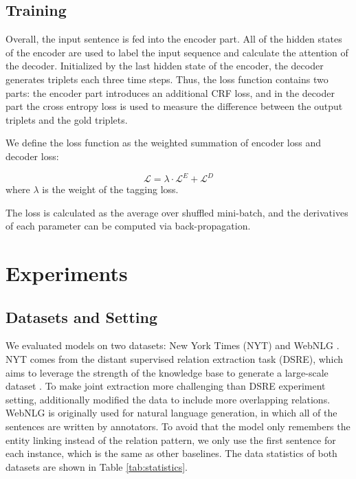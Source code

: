\documentclass[letterpaper]{article} \usepackage{aaai20}  \usepackage{times}  \usepackage{helvet} \usepackage{courier}  \usepackage[hyphens]{url}  \usepackage{graphicx}
\begin{document}
  \subsection{Training}
  
      Overall, the input sentence is fed into the encoder part. 
      All of the hidden states of the encoder are used to label the input sequence and calculate the attention of the decoder. 
      Initialized by the last hidden state of the encoder, the decoder generates triplets each three time steps. 
      Thus, the loss function contains two parts: the encoder part introduces an additional CRF loss, and in the decoder part the cross entropy loss is used to measure the difference between the output triplets and the gold triplets. 
  
      We define the loss function as the weighted summation of encoder loss and decoder loss:
  
  \begin{equation}
      \mathcal{L}= \lambda \cdot \mathcal{L}^E +\mathcal{L}^D
  \end{equation}
  where $\lambda$ is the weight of the tagging loss.
  
  The loss is calculated as the average over shuffled mini-batch, and the derivatives of each parameter can be computed via back-propagation. 



    
  
  \section{Experiments}
  










  \subsection{Datasets and Setting}
  


      We evaluated models on two datasets: New York Times (NYT) \cite{nyt} 
and WebNLG \cite{webnlg}. 
      NYT comes from the distant supervised relation extraction task (DSRE), which aims to leverage the strength of the knowledge base to generate a large-scale dataset \cite{dsre}. To make joint extraction more challenging than DSRE experiment setting, \citeauthor{CopyRE}  additionally modified the data to include more overlapping relations.
WebNLG is originally used for natural language generation, in which all of the sentences are written by annotators. To avoid that the model only remembers the entity linking instead of the relation pattern, we only use the first sentence for each instance, which is the same as other baselines. 
The data statistics of both datasets are shown in Table \ref{tab:statistics}.  
\end{document}
